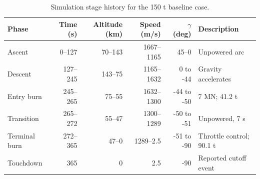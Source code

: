 \begin{table}[htbp]
\caption{Simulation stage history for the 150 t baseline case.}
\label{tab:src6}
\small
\setlength{\tabcolsep}{3.5pt}
\begin{tabularx}{\linewidth}{@{}p{.16\linewidth}rrrrX@{}}
\toprule
Phase & Time (s) & Altitude (km) & Speed (m/s) & $\gamma$ (deg) & Description \\
\midrule
Ascent & 0--127 & 70--143 & 1667--1165 & 45--0 & Unpowered arc \\
Descent & 127--245 & 143--75 & 1165--1632 & 0 to -44 & Gravity accelerates \\
Entry burn & 245--265 & 75--55 & 1632--1300 & -44 to -50 & 7 MN; 41.2 t \\
Transition & 265--272 & 55--47 & 1300--1289 & -50 to -51 & Unpowered, 7 s \\
Terminal burn & 272--365 & 47--0 & 1289--2.5 & -51 to -90 & Throttle control; 90.1 t \\
Touchdown & 365 & 0 & 2.5 & -90 & Reported cutoff event \\
\bottomrule
\end{tabularx}
\par{}
\end{table}
